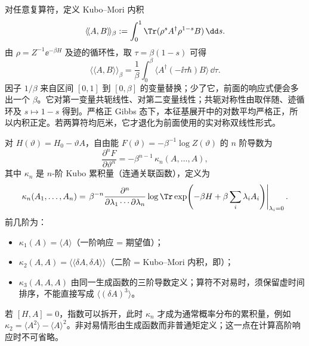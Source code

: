 \begin{definition}
对任意复算符，定义 Kubo--Mori 内积
\begin{equation*}
 \langle\!\langle A,B\rangle\!\rangle_\beta
 :=\int_0^1\Tr(\rho^s A^\dagger\rho^{1-s}B)\,\dd s.
\end{equation*}
由 \(\rho=Z^{-1}\ee^{-\beta H}\) 及迹的循环性，取 \(\tau=\beta(1-s)\) 可得
\begin{equation*}
 \langle\!\langle A,B\rangle\!\rangle_\beta
 =\frac1\beta\int_0^\beta\langle A^\dagger(-\ii\tau\hbar)B\rangle\,\dd\tau.
\end{equation*}
因子 \(1/\beta\) 来自区间 \([0,1]\) 到 \([0,\beta]\) 的变量替换；少了它，前面的响应式便会多出一个 \(\beta\)。它对第一变量共轭线性、对第二变量线性；共轭对称性由取伴随、迹循环及 $s\mapsto1-s$ 得到。严格正 Gibbs 态下，本征基展开中的对数平均严格正，所以内积正定。若两算符均厄米，它才退化为前面使用的实对称双线性形式。

对 \(H(\vartheta)=H_0-\vartheta A\)，自由能 \(F(\vartheta)=-\beta^{-1}\log Z(\vartheta)\) 的 \(n\) 阶导数为
\begin{equation}
 \frac{\partial^n F}{\partial\vartheta^n}
 =-\beta^{n-1}\,\kappa_n(A,\ldots,A),
 \label{eq:phys-sm-nth-response-general}
\end{equation}
其中 \(\kappa_n\) 是 \(n\)-阶 Kubo 累积量（连通关联函数），定义为
\begin{equation*}
 \kappa_n(A_1,\ldots,A_n)
 =\left.\beta^{-n}\frac{\partial^n}{\partial\lambda_1\cdots\partial\lambda_n}\log\Tr\exp\!\left(-\beta H+\beta\sum_i\lambda_i A_i\right)\right|_{\lambda_i=0}.
\end{equation*}
前几阶为：
\begin{itemize}
 \item \(\kappa_1(A)=\langle A\rangle\)（一阶响应 = 期望值）；
 \item \(\kappa_2(A,A)=\langle\!\langle\delta A,\delta A\rangle\!\rangle\)（二阶 = Kubo--Mori 内积，即）；
 \item \(\kappa_3(A,A,A)\) 由同一生成函数的三阶导数定义；算符不对易时，须保留虚时间排序，不能直接写成 \(\langle(\delta A)^3\rangle\)。
\end{itemize}
若 \([H,A]=0\)，指数可以拆开，此时 \(\kappa_n\) 才成为通常概率分布的累积量，例如 \(\kappa_2=\langle A^2\rangle-\langle A\rangle^2\)。非对易情形由生成函数而非普通矩定义；这一点在计算高阶响应时不可省略。
\end{definition}

